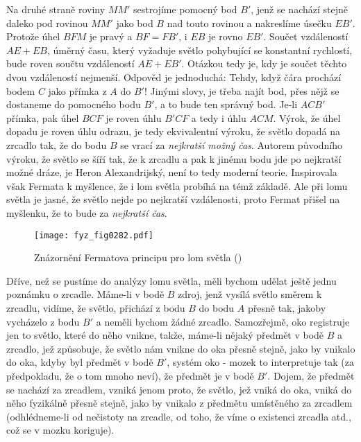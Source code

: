     Na druhé straně roviny \(MM'\) sestrojíme pomocný bod \(B'\), jenž se nachází stejně daleko pod 
    rovinou \(MM'\) jako bod \(B\) nad touto rovinou a nakreslíme úsečku \(EB'\). Protože úhel 
    \(BFM\) je pravý a \(BF = FB'\), i \(EB\) je rovno \(EB'\). Součet vzdáleností \(AE + EB\), 
    úměrný času, který vyžaduje světlo pohybující se konstantní rychlostí, bude roven součtu 
    vzdáleností \(AE + EB'\). Otázkou tedy je, kdy je součet těchto dvou vzdáleností nejmenší. 
    Odpověd je jednoduchá: Tehdy, když čára prochází bodem \(C\) jako přímka z \(A\) do \(B'\)! 
    Jinými slovy, je třeba najít bod, přes nějž se dostaneme do pomocného bodu \(B'\), a to bude 
    ten správný bod. Je-li \(ACB'\) přímka, pak úhel \(BCF\) je roven úhlu \(B'CF\) a tedy i úhlu 
    \(ACM\). Výrok, že úhel dopadu je roven úhlu odrazu, je tedy ekvivalentní výroku, že světlo 
    dopadá na zrcadlo tak, že do bodu \(B\) se vrací za \emph{nejkratší možný čas}. Autorem 
    původního výroku, že světlo se šíří tak, že k zrcadlu a pak k jinému bodu jde po nejkratší 
    možné dráze, je Heron Alexandrijský, není to tedy moderní teorie. Inspirovala však Fermata k 
    myšlence, že i lom světla probíhá na témž základě. Ale při lomu světla je jasné, že světlo 
    nejde po nejkratší vzdálenosti, proto Fermat přišel na myšlenku, že to bude za \emph{nejkratší 
    čas}.
    
    \begin{figure}[ht!] %
      \centering
      \texttt{[image: fyz\_fig0282.pdf]}
      \caption{Znázornění Fermatova principu pro lom světla
               (\cite[s.~348]{Feynman01})}
      \label{fyz:fig0282}
    \end{figure}

    Dříve, než se pustíme do analýzy lomu světla, měli bychom udělat ještě jednu poznámku o 
    zrcadle. Máme-li v bodě \(B\) zdroj, jenž vysílá světlo směrem k zrcadlu, vidíme, že světlo, 
    přichází z bodu \(B\) do bodu \(A\) přesně tak, jakoby vycházelo z bodu \(B'\) a neměli bychom 
    žádné zrcadlo. Samozřejmě, oko registruje jen to světlo, které do něho vnikne, takže, máme-li 
    nějaký předmět v bodě \(B\) a zrcadlo, jež způsobuje, že světlo nám vnikne do oka přesně 
    stejně, jako by vnikalo do oka, kdyby byl předmět v bodě \(B'\), systém oko - mozek to 
    interpretuje tak (za předpokladu, že o tom mnoho neví), že předmět je v bodě \(B'\). Dojem, že 
    předmět se nachází za zrcadlem, vzniká jenom proto, že světlo, jež vniká do oka, vniká do něho 
    fyzikálně přesně stejně, jako by vnikalo z předmětu umístěného za zrcadlem (odhlédneme-li od 
    nečistoty na zrcadle, od toho, že víme o existenci zrcadla atd., což se v mozku koriguje).
    
